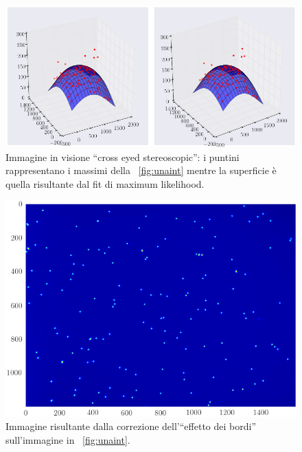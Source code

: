 \begin{figure}
 \centering
 \includegraphics[scale=0.45]{img/CAP3gauss.png}
 \caption{\small{Immagine in visione ``cross eyed stereoscopic'': i puntini rappresentano i massimi della \figurename~\ref{fig:unaint} mentre la superficie è quella risultante dal fit di maximum likelihood.}}
 \label{fig:gauss}
\end{figure}

\begin{figure}[p]
 \centering
 \includegraphics[scale=.64]{img/CAP3unaintcorr.png}
 \caption{\small{Immagine risultante dalla correzione dell'``effetto dei bordi'' sull'immagine in \figurename~\ref{fig:unaint}.}}
 \label{fig:unaintcorr}
\end{figure}

